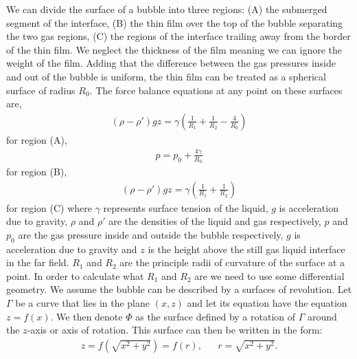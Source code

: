 We can divide the surface of a bubble into three regions: (A) the submerged segment of the interface, (B) the thin film over the top of the bubble separating the two gas regions, (C) the regions of the interface trailing away from the border of the thin film. We neglect the thickness of the film meaning we can ignore the weight of the film. Adding that the difference between the gas pressures inside and out of the bubble is uniform, the thin film can be treated as a spherical surface of radius $R_0$. The force balance equations at any point on these surfaces are,
\begin{align}\label{A_untransformed}
    (\rho-\rho')gz = \gamma \left( \frac{1}{R_1}+\frac{1}{R_2}-\frac{4}{R_0} \right)
\end{align}
for region (A),
\begin{align}\label{B_untransformed}
    p=p_0 + \frac{4\gamma}{R_0}
\end{align}
for region (B),
\begin{align}\label{C_untransformed}
    (\rho-\rho')gz = \gamma \left(\frac{1}{R_1}+\frac{1}{R_2} \right)
\end{align}
for region (C) where $\gamma$ represents surface tension of the liquid, $g$ is acceleration due to gravity, $\rho$ and $\rho'$ are the densities of the liquid and gas respectively, $p$ and $p_0$ are the gas pressure inside and outside the bubble respectively, $g$ is acceleration due to gravity and $z$ is the height above the still gas liquid interface in the far field. $R_1$ and $R_2$ are the principle radii of curvature of the surface at a point. In order to calculate what $R_1$ and $R_2$ are we need to use some differential geometry. We assume the bubble can be described by a surfaces of revolution.
Let $\Gamma$ be a curve that lies in the plane $(x,z)$ and let its equation have the equation $z=f(x)$. We then denote $\Phi$ as the surface defined by a rotation of $\Gamma$ around the $z$-axis or axis of rotation. This surface can then be written in the form:
\begin{align}
    z=f(\sqrt{x^2+y^2})=f(r), && r=\sqrt{x^2+y^2}.
\end{align}


